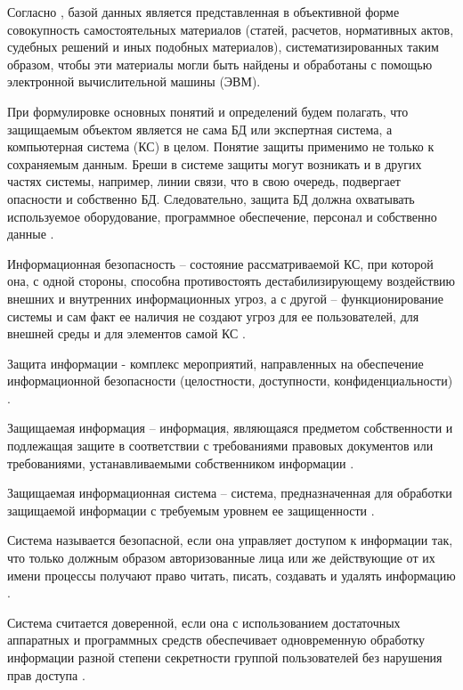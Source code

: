 \begin{grayquote}
	Согласно \autocite{CCRFPart4}, базой данных является представленная в объективной форме совокупность самостоятельных материалов (статей, расчетов, нормативных актов, судебных решений и иных подобных материалов), систематизированных таким образом, чтобы эти материалы могли быть найдены и обработаны с помощью электронной вычислительной машины (ЭВМ).
\end{grayquote}

При формулировке основных понятий и определений будем полагать, что защищаемым объектом является не сама БД или экспертная система, а компьютерная система (КС) в целом. Понятие защиты применимо не только к сохраняемым данным. Бреши в системе защиты могут возникать и в других частях системы, например, линии связи, что в свою очередь, подвергает опасности и собственно БД. Следовательно, защита БД должна охватывать используемое оборудование, программное обеспечение, персонал и собственно данные \autocite[сс. 15-18]{Skakun}. 

Информационная безопасность – состояние рассматриваемой КС, при которой она, с одной стороны, способна противостоять дестабилизирующему воздействию внешних и внутренних информационных угроз, а с другой – функционирование системы и сам факт ее наличия не создают угроз для ее пользователей, для внешней среды и для элементов самой КС \autocite[сс. 15-18]{Skakun}.

Защита информации - комплекс мероприятий, направленных на обеспечение информационной безопасности (целостности, доступности, конфиденциальности) \autocite[сс. 15-18]{Skakun}.

Защищаемая информация – информация, являющаяся предметом собственности и подлежащая защите в соответствии с требованиями правовых документов или требованиями, устанавливаемыми собственником информации \autocite[сс. 15-18]{Skakun}.

Защищаемая информационная система – система, предназначенная для обработки защищаемой информации с требуемым уровнем ее защищенности \autocite[сс. 15-18]{Skakun}.

Система называется безопасной, если она управляет доступом к информации так, что только должным образом авторизованные лица или же действующие от их имени процессы получают право читать, писать, создавать и удалять информацию \autocite[сс. 15-18]{Skakun}. 

Система считается доверенной, если она с использованием достаточных аппаратных и программных средств обеспечивает одновременную обработку информации разной степени секретности группой пользователей без нарушения прав доступа \autocite[сс. 15-18]{Skakun}.

